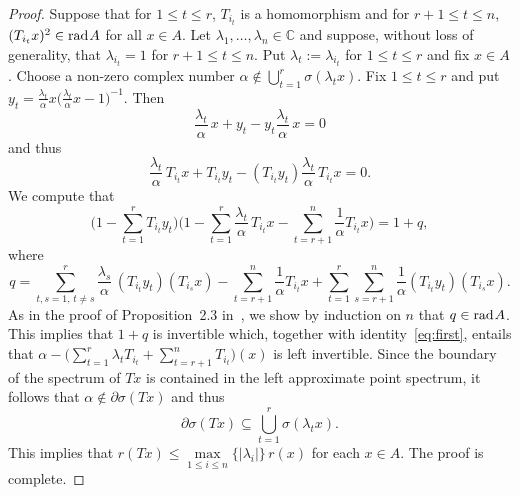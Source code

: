 \documentclass[a4paper,12pt,reqno]{amsart}
\numberwithin{equation}{section}
\theoremstyle{definition}
\begin{document}
\begin{proof}
Suppose that for $1\leq t\leq r$, $T_{i_t}$ is a homomorphism and for $r+1\leq t\leq n$, $(T_{i_t} x)^2\in{{\textup{rad}\kern.7pt A}}$ for all $x\in A$.
Let $\lambda_1, \ldots,\lambda_n \in{\mathbb{C}}$ and suppose, without loss of generality, that $\lambda_{i_t}=1$ for $r+1\leq t\leq n$.
Put $\lambda_t:=\lambda_{i_t}$ for $1\leq t\leq r$ and fix $x\in A$.
Choose a non-zero complex number $\alpha\not\in\bigcup_{t=1}^r \sigma(\lambda_t x)$.
Fix $1\leq t\leq r$ and put  $y_t=\frac{\lambda_t}{\alpha}x\bigl(\frac{\lambda_t}{\alpha}x-1\bigr)^{-1}$. Then
\begin{equation*}
\frac{\lambda_t}{\alpha}\,x +y_t-y_t \frac{\lambda_t}{\alpha}\,x=0
\end{equation*}
and thus
\begin{equation*}
\frac{\lambda_t}{\alpha}\,T_{i_t}x +T_{i_t}y_t - (T_{i_t}y_t)\frac{\lambda_t}{\alpha}\,T_{i_t}x=0.
\end{equation*}
We compute that
\begin{equation}\label{eq:first}
\bigl(1- \sum_{t=1}^r T_{i_t}y_t\bigr) \bigl(1- \sum_{t=1}^r\frac{\lambda_t}{\alpha}\,T_{i_t}x-\sum_{t=r+1}^n\frac{1}{\alpha}T_{i_t}x\bigr)
= 1+q,
\end{equation}
where
\begin{equation*}
q=\sum_{t,s=1,\, t\neq s}^r \frac{\lambda_s}{\alpha} \, (T_{i_t}y_t)(T_{i_s}x)
     - \sum_{t=r+1}^n \frac{1}{\alpha}T_{i_t}x + \sum_{t=1}^r\sum_{s=r+1}^n \frac{1}{\alpha}(T_{i_t}y_t)(T_{i_s}x).
\end{equation*}
As in the proof of Proposition~2.3 in~\cite{NaMa13}, we show by induction on $n$ that $q\in{{\textup{rad}\kern.7pt A}}$.
This implies that $1+q$ is invertible which, together with
identity~\eqref{eq:first}, entails that $\alpha-\bigl(\sum_{t=1}^r\lambda_t T_{i_t}+\sum_{t=r+1}^nT_{i_t}\bigr) (x)$ is left invertible.
Since the boundary of the spectrum of $Tx$ is contained in the left approximate point spectrum, it follows
that $ \alpha\notin\partial\sigma(Tx)$  and thus
\[
\partial\sigma (Tx) \subseteq \bigcup_{t=1}^r \sigma(\lambda_tx) .
\]
This implies that $r(Tx)\leq\max\limits_{1\leq i\leq n}\{|\lambda_i|\}\,r(x)$ for each $x\in A$. The  proof is complete.
\end{proof}
\end{document}
